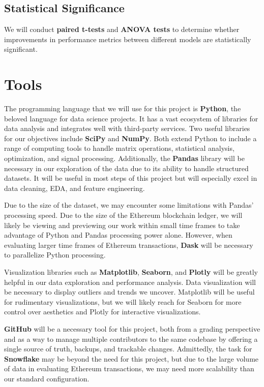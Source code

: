 \documentclass[sigconf]{acmart}
\begin{document}
\subsection{Statistical Significance}
We will conduct \textbf{paired t-tests} and \textbf{ANOVA tests} to determine whether improvements in performance metrics between different models are statistically significant.


\section{Tools}
The programming language that we will use for this project is \textbf{Python}, the beloved language for data science projects. It has a vast ecosystem of libraries for data analysis and integrates well with third-party services. Two useful libraries for our objectives include \textbf{SciPy} and \textbf{NumPy}. Both extend Python to include a range of computing tools to handle matrix operations, statistical analysis, optimization, and signal processing. Additionally, the \textbf{Pandas} library will be necessary in our exploration of the data due to its ability to handle structured datasets. It will be useful in most steps of this project but will especially excel in data cleaning, EDA, and feature engineering.

Due to the size of the dataset, we may encounter some limitations with Pandas’ processing speed. Due to the size of the Ethereum blockchain ledger, we will likely be viewing and previewing our work within small time frames to take advantage of Python and Pandas processing power alone. However, when evaluating larger time frames of Ethereum transactions, \textbf{Dask} will be necessary to parallelize Python processing.

Visualization libraries such as \textbf{Matplotlib}, \textbf{Seaborn}, and \textbf{Plotly} will be greatly helpful in our data exploration and performance analysis. Data visualization will be necessary to display outliers and trends we uncover. Matplotlib will be useful for rudimentary visualizations, but we will likely reach for Seaborn for more control over aesthetics and Plotly for interactive visualizations.

\textbf{GitHub} will be a necessary tool for this project, both from a grading perspective and as a way to manage multiple contributors to the same codebase by offering a single source of truth, backups, and trackable changes. Admittedly, the task for \textbf{Snowflake} may be beyond the need for this project, but due to the large volume of data in evaluating Ethereum transactions, we may need more scalability than our standard configuration.
\end{document}
